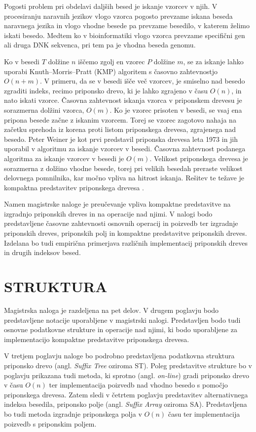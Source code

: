 Pogosti problem pri obdelavi daljših besed je iskanje vzorcev v njih. V procesiranju naravnih jezikov vlogo vzorca pogosto prevzame iskana beseda naravnega jezika in vlogo vhodne besede pa prevzame besedilo, v katerem želimo iskati besedo. Medtem ko v bioinformatiki vlogo vzorca prevzame specifični gen ali druga DNK sekvenca, pri tem pa je vhodna beseda genomu. 

Ko v besedi $T$ dolžine $n$ iščemo zgolj en vzorec $P$ dolžine $m$, se za iskanje lahko uporabi Knuth–Morris–Pratt (KMP) algoritem s časovno zahtevnostjo $O(n+m)$. V primeru, da se v besedi išče več vzorcev, je smiselno nad besedo zgraditi indeks, recimo priponsko drevo, ki je lahko zgrajeno v času $O(n)$, in nato iskati vzorce. Časovna zahtevnost iskanja vzorca v priponskem drevesu je sorazmerna dolžini vzorca, $O(m)$. Ko je vzorec prisoten v besedi, se vsaj ena pripona besede začne z iskanim vzorcem. 
Torej se vzorec zagotovo nahaja na začetku sprehoda iz korena proti listom priponskega drevesa, zgrajenega nad besedo. 
Peter Weiner je kot prvi predstavil priponska drevesa leta 1973 \cite{Weiner1973} in jih uporabil v algoritmu za iskanje vzorcev v besedi. Časovna zahtevnost podanega algoritma za iskanje vzorcev v besedi je $O(m)$. Velikost priponskega drevesa je sorazmerna z dolžino vhodne besede, torej pri velikih besedah preraste velikost delovnega pomnilnika, kar močno vpliva na hitrost iskanja. Rešitev te težave je kompaktna predstavitev priponskega drevesa \cite{Navarro2016}.

Namen magistrske naloge je preučevanje vpliva kompaktne predstavitve na izgradnjo priponskih dreves in na operacije nad njimi. V nalogi bodo predstavljene časovne zahtevnosti osnovnih operacij in poizvedb ter izgradnje priponskih dreves, priponskih polj in kompaktne predstavitve priponskih dreves. Izdelana bo tudi empirična primerjava različnih implementacij priponskih dreves in drugih indeksov besed.

\section{STRUKTURA}\label{sec:struktura}

Magistrska naloga je razdeljena na pet delov. V drugem poglavju bodo predstavljene notacije uporabljene v magistrski nalogi. Predstavljen bodo tudi osnovne podatkovne strukture in operacije nad njimi, ki bodo uporabljene za implementacijo kompaktne predstavitve priponskega drevesa.

V tretjem poglavju naloge bo podrobno predstavljena podatkovna struktura priponsko drevo (angl. \textit{Suffix Tree} oziroma ST). Poleg predstavitve strukture bo v poglavju prikazana tudi metoda, ki sprotno (angl. \textit{on-line}) gradi priponsko drevo v času $O(n)$ ter implementacija poizvedb nad vhodno besedo s pomočjo priponskega drevesa. Zatem sledi v četrtem poglavju predstavitev alternativnega indeksa besedila, priponsko polje (angl. \textit{Suffix Array} oziroma SA). Predstavljena bo tudi metoda izgradnje priponskega polja v $O(n)$ času ter implementacija poizvedb s priponskim poljem.

